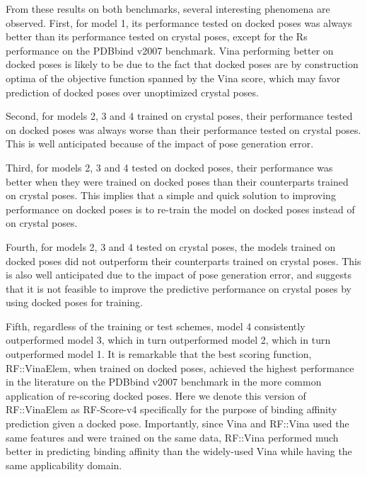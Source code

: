 From these results on both benchmarks, several interesting phenomena are observed. First, for model 1, its performance tested on docked poses was always better than its performance tested on crystal poses, except for the Rs performance on the PDBbind v2007 benchmark. Vina performing better on docked poses is likely to be due to the fact that docked poses are by construction optima of the objective function spanned by the Vina score, which may favor prediction of docked poses over unoptimized crystal poses.

Second, for models 2, 3 and 4 trained on crystal poses, their performance tested on docked poses was always worse than their performance tested on crystal poses. This is well anticipated because of the impact of pose generation error.

Third, for models 2, 3 and 4 tested on docked poses, their performance was better when they were trained on docked poses than their counterparts trained on crystal poses. This implies that a simple and quick solution to improving performance on docked poses is to re-train the model on docked poses instead of on crystal poses.

Fourth, for models 2, 3 and 4 tested on crystal poses, the models trained on docked poses did not outperform their counterparts trained on crystal poses. This is also well anticipated due to the impact of pose generation error, and suggests that it is not feasible to improve the predictive performance on crystal poses by using docked poses for training.

Fifth, regardless of the training or test schemes, model 4 consistently outperformed model 3, which in turn outperformed model 2, which in turn outperformed model 1. It is remarkable that the best scoring function, RF::VinaElem, when trained on docked poses, achieved the highest performance in the literature on the PDBbind v2007 benchmark in the more common application of re-scoring docked poses. Here we denote this version of RF::VinaElem as RF-Score-v4 specifically for the purpose of binding affinity prediction given a docked pose. Importantly, since Vina and RF::Vina used the same features and were trained on the same data, RF::Vina performed much better in predicting binding affinity than the widely-used Vina while having the same applicability domain.

